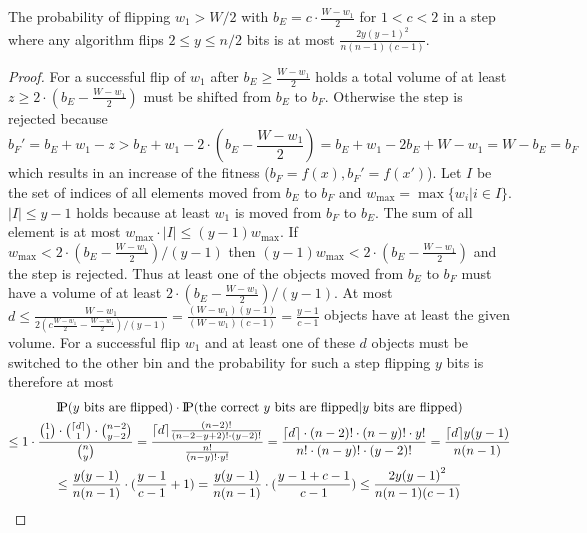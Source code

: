 \begin{lemma}\label{lemma:W1FlipWontHappen}
    The probability of flipping $w_1>W/2$ with $b_E = c\cdot\frac{W-w_1}{2}$ for $1<c<2$ in a step where any algorithm flips $2\le y\le n/2$ bits is at most \(\frac{2y{(y-1)}^2}{n(n-1)(c-1)}\).
\end{lemma}
\begin{proof}
    For a successful flip of $w_1$ after $b_E \ge \frac{W-w_1}{2}$ holds a total volume of at least $z\ge2\cdot(b_E-\frac{W-w_1}{2})$ must be shifted from $b_E$ to $b_F$.
    Otherwise the step is rejected because
    \[b_F'=b_E+w_1-z>b_E+w_1-2\cdot(b_E-\frac{W-w_1}{2})=b_E+w_1-2b_E+W-w_1=W-b_E=b_F\]
    which results in an increase of the fitness ($b_F = f(x), b_F' = f(x')$).
    Let $I$ be the set of indices of all elements moved from $b_E$ to $b_F$ and $w_{\max}=\max{\{w_i|i\in I\}}$.
    $|I|\le y-1$ holds because at least $w_1$ is moved from $b_F$ to $b_E$.
    The sum of all element is at most $w_{\max} \cdot |I| \le (y-1)w_{\max}$.
    If \(w_{\max}<2\cdot(b_E-\frac{W-w_1}{2})/(y-1)\) then \((y-1)w_{\max}<2\cdot(b_E-\frac{W-w_1}{2})\) and the step is rejected.
    Thus at least one of the objects moved from $b_E$ to $b_F$ must have a volume of at least $2\cdot(b_E-\frac{W-w_1}{2})/(y-1)$.
    At most \(d\le\frac{W-w_1}{2(c\frac{W-w_1}{2}-\frac{W-w_1}{2})/(y-1)}=\frac{(W-w_1)(y-1)}{(W-w_1)(c-1)}=\frac{y-1}{c-1}\) objects have at least the given volume.
    For a successful flip $w_1$ and at least one of these $d$ objects must be switched to the other bin and the probability for such a step flipping $y$ bits is therefore at most
    \begin{gather}
        \nonumber \text{I\kern-0.15em P}(y \text{ bits are flipped})\cdot\text{I\kern-0.15em P}(\text{the correct $y$ bits are flipped} | y \text{ bits are flipped})\\ \nonumber
        \le 1\cdot \frac{\binom{1}{1}\cdot\binom{\lceil d\rceil}{1}\cdot\binom{n-2}{y-2}}{\binom{n}{y}}
        =\frac{\lceil d\rceil\frac{(n-2)!}{(n-2-y+2)!\cdot (y-2)!}}{\frac{n!}{(n-y)!\cdot y!}}
        =\frac{\lceil d\rceil\cdot(n-2)!\cdot(n-y)!\cdot y!}{n!\cdot(n-y)!\cdot(y-2)!}
        = \frac{\lceil d\rceil y{(y-1)}}{n(n-1)}\\ \nonumber
        \le \frac{y{(y-1)}}{n(n-1)}\cdot(\frac{y-1}{c-1}+1)
        = \frac{y{(y-1)}}{n(n-1)}\cdot(\frac{y-1+c-1}{c-1})
        \le \frac{2y{(y-1)}^2}{n(n-1)(c-1)}
    \end{gather}
\end{proof}

